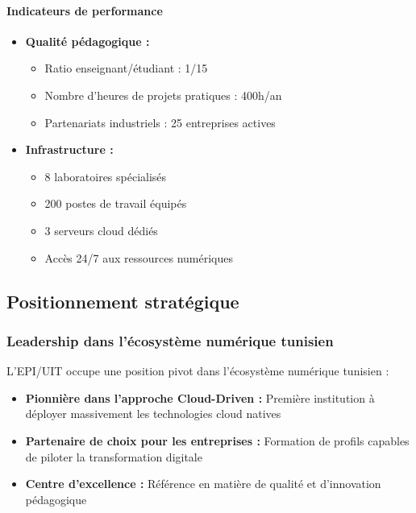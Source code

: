 \paragraph{Indicateurs de performance}
\begin{itemize}
    \item \textbf{Qualité pédagogique :}
    \begin{itemize}
        \item Ratio enseignant/étudiant : 1/15
        \item Nombre d'heures de projets pratiques : 400h/an
        \item Partenariats industriels : 25 entreprises actives
    \end{itemize}
    \item \textbf{Infrastructure :}
    \begin{itemize}
        \item 8 laboratoires spécialisés
        \item 200 postes de travail équipés
        \item 3 serveurs cloud dédiés
        \item Accès 24/7 aux ressources numériques
    \end{itemize}
\end{itemize}

\subsection{Positionnement stratégique}

\subsubsection{Leadership dans l'écosystème numérique tunisien}
L'EPI/UIT occupe une position pivot dans l'écosystème numérique tunisien :
\begin{itemize}
    \item \textbf{Pionnière dans l'approche Cloud-Driven :} Première institution à déployer massivement les technologies cloud natives
    \item \textbf{Partenaire de choix pour les entreprises :} Formation de profils capables de piloter la transformation digitale
    \item \textbf{Centre d'excellence :} Référence en matière de qualité et d'innovation pédagogique
\end{itemize}

